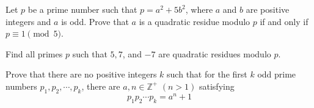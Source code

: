 \documentclass{subfile}
\begin{document}
	\begin{problem}
		Let $p$ be a prime number such that $p=a^2+5b^2$, where $a$ and $b$ are positive integers and $a$ is odd. Prove that $a$ is a quadratic residue modulo $p$ if and only if $p \equiv 1 \pmod 5$.
	\end{problem}


	\begin{problem} %
		Find all primes $p$ such that $5,7$, and $-7$ are quadratic residues modulo $p$.
	\end{problem}



	\begin{problem}
		Prove that there are no positive integers $k$ such that for the first $k$ odd prime numbers $p_1,p_2,\cdots,p_k$, there are $a,n\in\mathbb{Z}^+$ $(n>1)$ satisfying \[ p_1p_2\cdots p_k=a^n+1\] %
	\end{problem}
\end{document}
